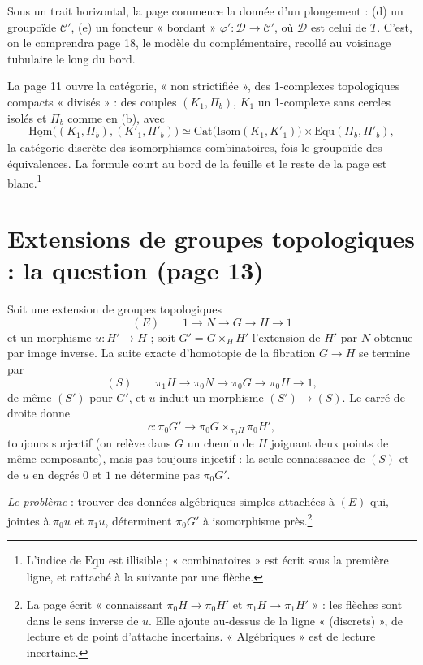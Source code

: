 \documentclass[11pt,a4paper]{article}
\begin{document}
Sous un trait horizontal, la page commence la donnée d'un plongement : (d) un
groupoïde $\mathcal{C}'$, (e) un foncteur « bordant » $\varphi' : \mathcal{D}
\to \mathcal{C}'$, où $\mathcal{D}$ est celui de $T$. C'est, on le
comprendra page 18, le modèle du complémentaire, recollé au voisinage
tubulaire le long du bord.

La page 11 ouvre la catégorie, « non strictifiée », des 1-complexes
topologiques compacts « divisés » : des couples $(K_1, \Pi_b)$, $K_1$ un
1-complexe sans cercles isolés et $\Pi_b$ comme en (b), avec
\[
  \underline{\mathrm{Hom}}\bigl((K_1, \Pi_b), (K'_1, \Pi'_b)\bigr) \simeq
  \mathrm{Cat}\bigl(\mathrm{Isom}(K_1, K'_1)\bigr) \times
  \underline{\mathrm{Equ}}(\Pi_b, \Pi'_b) ,
\]
la catégorie discrète des isomorphismes combinatoires, fois le groupoïde des
équivalences. La formule court au bord de la feuille et le reste de la page
est blanc.\footnote{L'indice de $\underline{\mathrm{Equ}}$ est illisible ;
« combinatoires » est écrit sous la première ligne, et rattaché à la suivante
par une flèche.}

\section*{Extensions de groupes topologiques : la question (page 13)}

Soit une extension de groupes topologiques
\[
  (E) \qquad 1 \to N \to G \to H \to 1
\]
et un morphisme $u : H' \to H$ ; soit $G' = G \times_H H'$ l'extension de
$H'$ par $N$ obtenue par image inverse. La suite exacte d'homotopie de la
fibration $G \to H$ se termine par
\[
  (S) \qquad \pi_1 H \longrightarrow \pi_0 N \longrightarrow \pi_0 G
  \longrightarrow \pi_0 H \longrightarrow 1 ,
\]
de même $(S')$ pour $G'$, et $u$ induit un morphisme $(S') \to (S)$. Le carré
de droite donne
\[
  c : \pi_0 G' \longrightarrow \pi_0 G \times_{\pi_0 H} \pi_0 H' ,
\]
toujours surjectif (on relève dans $G$ un chemin de $H$ joignant deux points
de même composante), mais pas toujours injectif : la seule connaissance de
$(S)$ et de $u$ en degrés $0$ et $1$ ne détermine pas $\pi_0 G'$.

\emph{Le problème} : trouver des données algébriques simples attachées à
$(E)$ qui, jointes à $\pi_0 u$ et $\pi_1 u$, déterminent $\pi_0 G'$ à
isomorphisme près.\footnote{La page écrit « connaissant $\pi_0 H \to \pi_0 H'$
et $\pi_1 H \to \pi_1 H'$ » : les flèches sont dans le sens inverse de $u$.
Elle ajoute au-dessus de la ligne « (discrets) », de lecture et de point
d'attache incertains. « Algébriques » est de lecture incertaine.}
\end{document}
